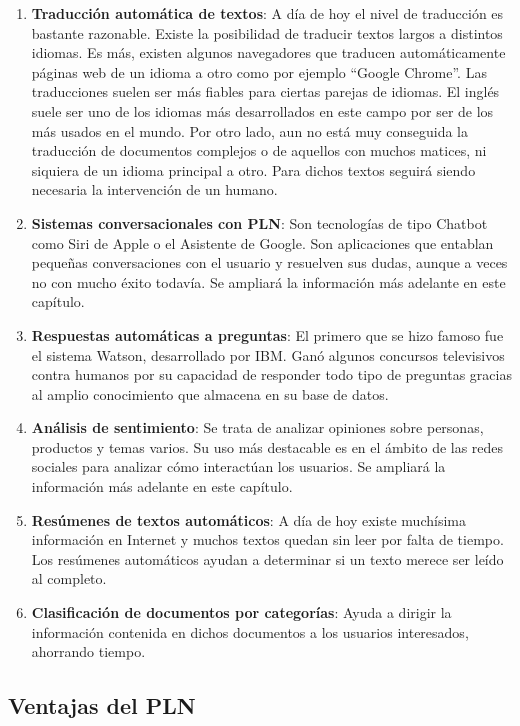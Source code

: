 \begin{enumerate}
	\item \textbf{Traducción automática de textos}: A día de hoy el nivel de traducción es bastante razonable. Existe la posibilidad de traducir textos largos a distintos idiomas. Es más, existen algunos navegadores que traducen automáticamente páginas web de un idioma a otro como por ejemplo ``Google Chrome''. Las traducciones suelen ser más fiables para ciertas parejas de idiomas. El inglés suele ser uno de los idiomas más desarrollados en este campo por ser de los más usados en el mundo. Por otro lado, aun no está muy conseguida la traducción de documentos complejos o de aquellos con muchos matices, ni siquiera de un idioma principal a otro. Para dichos textos seguirá siendo necesaria la intervención de un humano.
	\item \textbf{Sistemas conversacionales con PLN}: Son tecnologías de tipo Chatbot como Siri de Apple o el Asistente de Google. Son aplicaciones que entablan pequeñas conversaciones con el usuario y resuelven sus dudas, aunque a veces no con mucho éxito todavía. Se ampliará la información más adelante en este capítulo.
	\item \textbf{Respuestas automáticas a preguntas}: El primero que se hizo famoso fue el sistema Watson, desarrollado por IBM. Ganó algunos concursos televisivos contra humanos por su capacidad de responder todo tipo de preguntas gracias al amplio conocimiento que almacena en su base de datos.
	\item \textbf{Análisis de sentimiento}: Se trata de analizar opiniones sobre personas, productos y temas varios. Su uso más destacable es en el ámbito de las redes sociales para analizar cómo interactúan los usuarios. Se ampliará la información más adelante en este capítulo.
	\item \textbf{Resúmenes de textos automáticos}: A día de hoy existe muchísima  información en Internet y muchos textos quedan sin leer por falta de tiempo. Los resúmenes automáticos ayudan a determinar si un texto merece ser leído al completo. 
	\item \textbf{Clasificación de documentos por categorías}: Ayuda a dirigir la información contenida en dichos documentos a los usuarios interesados, ahorrando tiempo. 
\end{enumerate}

\subsection{Ventajas del PLN}

